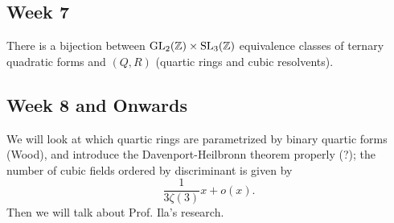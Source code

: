 \subsection{Week 7}
\begin{simplethm}[Bhargava]
    There is a bijection between $\operatorname{GL}_2(\mathbb Z) \times \operatorname{SL}_3(\mathbb Z)$ equivalence classes of ternary quadratic forms and $(Q, R)$ (quartic rings and cubic resolvents).
\end{simplethm}

\subsection{Week 8 and Onwards}
We will look at which quartic rings are parametrized by binary quartic forms (Wood), and introduce the Davenport-Heilbronn theorem properly (?); the number of cubic fields ordered by discriminant is given by
\[ \frac{1}{3 \zeta(3)} x + o(x). \]
Then we will talk about Prof. Ila's research.